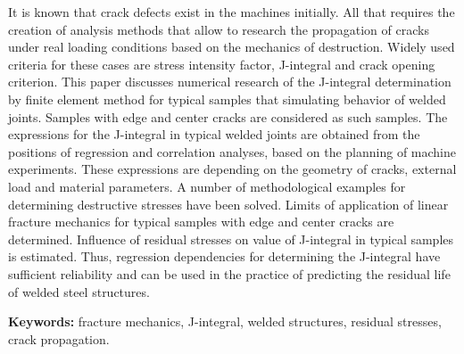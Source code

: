 It is known that crack defects exist in the machines initially. All that
requires the creation of analysis methods that allow to research the
propagation of cracks under real loading conditions based on the
mechanics of destruction. Widely used criteria for these cases are
stress intensity factor, J-integral and crack opening criterion. This
paper discusses numerical research of the J-integral determination by
finite element method for typical samples that simulating behavior of
welded joints. Samples with edge and center cracks are considered as
such samples. The expressions for the J-integral in typical welded
joints are obtained from the positions of regression and correlation
analyses, based on the planning of machine experiments. These
expressions are depending on the geometry of cracks, external load and
material parameters. A number of methodological examples for determining
destructive stresses have been solved. Limits of application of linear
fracture mechanics for typical samples with edge and center cracks are
determined. Influence of residual stresses on value of J-integral in
typical samples is estimated. Thus, regression dependencies for
determining the J-integral have sufficient reliability and can be used
in the practice of predicting the residual life of welded steel
structures.

{\bfseries Keywords:} fracture mechanics, J-integral, welded structures,
residual stresses, crack propagation.

